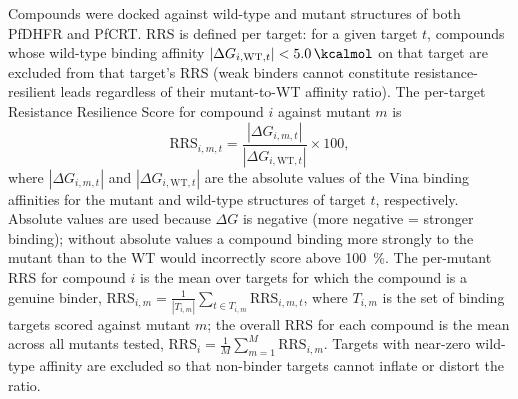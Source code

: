 \documentclass[11pt,a4paper]{article}
\begin{document}
Compounds were docked against wild-type and mutant structures of both PfDHFR and PfCRT. RRS is defined per target: for a given target $t$, compounds whose wild-type binding affinity $|\Delta G_{i,\mathrm{WT},t}| < \SI{5.0}{\kcalmol}$ on that target are excluded from that target's RRS (weak binders cannot constitute resistance-resilient leads regardless of their mutant-to-WT affinity ratio). The per-target Resistance Resilience Score for compound $i$ against mutant $m$ is
\begin{equation}
\mathrm{RRS}_{i,m,t} = \frac{|\Delta G_{i,m,t}|}{|\Delta G_{i,\mathrm{WT},t}|} \times 100,
\end{equation}
where $|\Delta G_{i,m,t}|$ and $|\Delta G_{i,\mathrm{WT},t}|$ are the absolute values of the Vina binding affinities for the mutant and wild-type structures of target $t$, respectively. Absolute values are used because $\Delta G$ is negative (more negative = stronger binding); without absolute values a compound binding more strongly to the mutant than to the WT would incorrectly score above \qty{100}{\percent}. The per-mutant RRS for compound $i$ is the mean over targets for which the compound is a genuine binder, $\mathrm{RRS}_{i,m} = \frac{1}{|T_{i,m}|}\sum_{t \in T_{i,m}} \mathrm{RRS}_{i,m,t}$, where $T_{i,m}$ is the set of binding targets scored against mutant $m$; the overall RRS for each compound is the mean across all mutants tested, $\mathrm{RRS}_i = \frac{1}{M}\sum_{m=1}^{M} \mathrm{RRS}_{i,m}$. Targets with near-zero wild-type affinity are excluded so that non-binder targets cannot inflate or distort the ratio.
\end{document}
